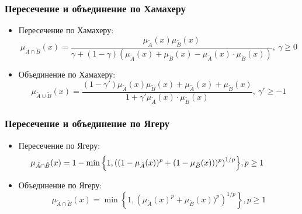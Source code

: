 \documentclass{beamer}
\begin{document}
\begin{frame}\frametitle{Пересечение и объединение по Хамахеру}

    \begin{itemize}
        \item Пересечение по Хамахеру:
        \[
            \mu_{\tilde{A} \cap \tilde{B}}(x) = \frac{\mu_{\tilde{A}}(x) \mu_{\tilde{B}}(x)}{\gamma + (1-\gamma)(\mu_{\tilde{A}}(x) + \mu_{\tilde{B}}(x) - \mu_{\tilde{A}}(x) \cdot \mu_{\tilde{B}}(x))},\ \gamma \geq 0
        \]
        \item Объединение по Хамахеру:
        \[
            \mu_{\tilde{A} \cup \tilde{B}}(x) = \frac{(1-\gamma')\mu_{\tilde{A}}(x) \mu_{\tilde{B}}(x) + \mu_{\tilde{A}}(x) + \mu_{\tilde{B}}(x)}{1 + \gamma' \mu_{\tilde{A}}(x) \cdot \mu_{\tilde{B}}(x)},\ \gamma' \geq -1
        \]
    \end{itemize}
    
\end{frame}

\begin{frame}\frametitle{Пересечение и объединение по Ягеру}

    \begin{itemize}
        \item Пересечение по Ягеру:
        \[ \hspace*{-1cm} 
            \mu_{\tilde{A} \cap \tilde{B}}(x) = 1 - \min{ \left\{ 1, \left( (1 - \mu_{\tilde{A}}(x))^p + (1 - \mu_{\tilde{B}}(x)))^p \right)^{1/p} \right\}}, p \geq 1
        \]
        \item Объединение по Ягеру:
        \[
            \mu_{\tilde{A} \cap \tilde{B}}(x) = \min{ \left\{ 1, \left( \mu_{\tilde{A}}(x)^p + \mu_{\tilde{B}}(x))^p \right)^{1/p} \right\}}, p \geq 1
        \]
    \end{itemize}
    
\end{frame}
\end{document}
